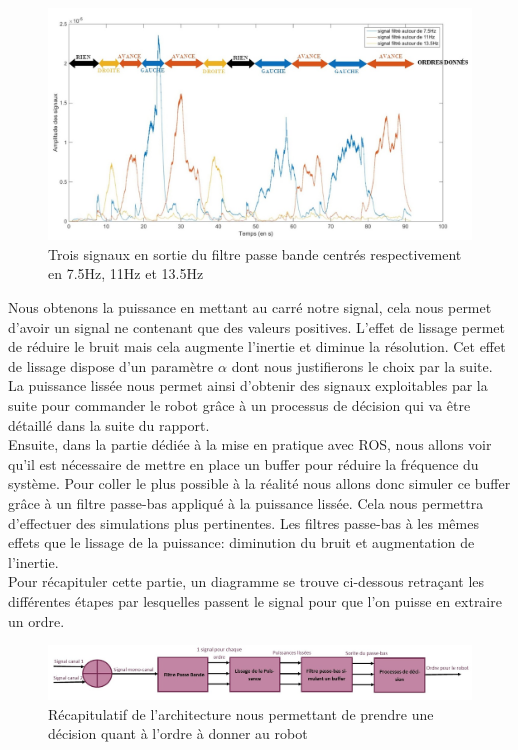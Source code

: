 \documentclass[11pt]{article}
\begin{document}
\begin{figure}[!h]
	\includegraphics[scale=0.75]{images/puissancelissee.jpg}
	\caption{Trois signaux en sortie du filtre passe bande centrés respectivement en 7.5Hz, 11Hz et 13.5Hz}
	\label{fig:duck}
\end{figure}

Nous obtenons la puissance en mettant au carré notre signal, cela nous permet d'avoir un signal ne contenant que des valeurs positives. L'effet de lissage permet de réduire le bruit mais cela augmente l'inertie et diminue la résolution. Cet effet de lissage dispose d'un paramètre $ \alpha $ dont nous justifierons le choix par la suite. 
La puissance lissée nous permet ainsi d'obtenir des signaux exploitables par la suite pour commander le robot grâce à un processus de décision qui va être détaillé dans la suite du rapport. \\

Ensuite, dans la partie dédiée à la mise en pratique avec ROS, nous allons voir qu'il est nécessaire de mettre en place un buffer pour réduire la fréquence du système. Pour coller le plus possible à la réalité nous allons donc simuler ce buffer grâce à un filtre passe-bas appliqué à la puissance lissée. Cela nous permettra d'effectuer des simulations plus pertinentes. Les filtres passe-bas à les mêmes effets que le lissage de la puissance: diminution du bruit et augmentation de l'inertie.\\

Pour récapituler cette partie, un diagramme se trouve ci-dessous retraçant les différentes étapes par lesquelles passent le signal pour que l'on puisse en extraire un ordre. \\


\begin{figure}[!h]
	\includegraphics[scale=0.65]{images/diagramme.jpg}
	\caption{Récapitulatif de l'architecture nous permettant de prendre une décision quant à l'ordre à donner au robot}
	\label{fig:duck}
\end{figure}
\end{document}
